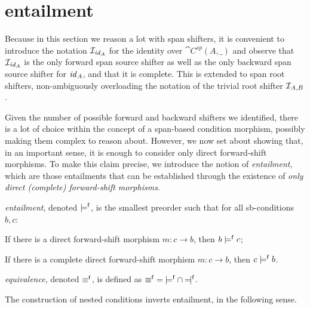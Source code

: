 \section{{\fprovable} entailment}

Because in this section we reason a lot with span shifters, it is convenient to introduce the notation $\mathcal{I}_{\mathit{id}_A}$ for the identity over  $\cat{C^{sp}}(A,\_)$ and observe that $\mathcal{I}_{\mathit{id}_A}$ is the only forward span source shifter as well as the only backward span source shifter for $\mathit{id}_A$, and that it is complete. This is extended to span root shifters, non-ambiguously overloading the notation of the trivial root shifter $\mathcal{I}_{A,B}$.

Given the number of possible forward and backward shifters we identified, there is a lot of choice within the concept of a span-based condition morphism, possibly making them complex to reason about. However, we now set about showing that, in an important sense, it is enough to consider only direct forward-shift morphisms. To make this claim precise, we introduce the notion of \emph{{\fprovable} entailment}, which are those entailments that can be established through the existence of \emph{only direct (complete) forward-shift morphisms}.

\begin{definition}
\emph{{\fprovable} entailment}, denoted $\models^{\mathsf f}$, is the smallest preorder such that for all sb-conditions $b,c$:
\begin{itemizeS}
\item If there is a direct forward-shift morphism $m:c\to b$, then $b\models^{\mathsf f} c$;
\item If there is a complete direct forward-shift morphism $m:c\to b$, then $c\models^{\mathsf f} b$.
\end{itemizeS}
\emph{{\fprovable} equivalence}, denoted $\equiv^{\mathsf f}$, is defined as ${\pequiv}={\pentails}\cap{\pentailedby}$.
\end{definition}
%
The construction of nested conditions inverts {\fprovable} entailment, in the following sense.

